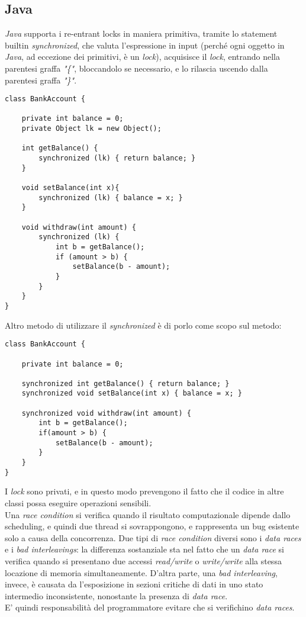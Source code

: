 \subsection{Java}
\textit{Java} supporta i re-entrant locks in maniera primitiva, tramite lo statement builtin \textit{synchronized}, che valuta l'espressione in input (perché ogni oggetto in \textit{Java}, ad eccezione dei primitivi, è un \textit{lock}), acquisisce il \textit{lock}, entrando nella parentesi graffa \textit{"\{"}, bloccandolo se necessario, e lo rilascia uscendo dalla parentesi graffa \textit{"\}"}.
\begin{lstlisting}
class BankAccount {

	private int balance = 0;
	private Object lk = new Object();

	int getBalance() {
		synchronized (lk) { return balance; }
	}

	void setBalance(int x){
		synchronized (lk) { balance = x; }
	}

	void withdraw(int amount) {
		synchronized (lk) {
			int b = getBalance();
			if (amount > b) {
				setBalance(b - amount);
			}
		}
	}
}
\end{lstlisting}

\newpage
Altro metodo di utilizzare il \textit{synchronized} è di porlo come scopo sul metodo:
\begin{lstlisting}
class BankAccount {

	private int balance = 0;

	synchronized int getBalance() { return balance; }
	synchronized void setBalance(int x) { balance = x; }

	synchronized void withdraw(int amount) {
		int b = getBalance();
		if(amount > b) {
			setBalance(b - amount);
		}
	}
}
\end{lstlisting}
I \textit{lock} sono privati, e in questo modo prevengono il fatto che il codice in altre classi possa eseguire operazioni sensibili. \\

Una \textit{race condition} si verifica quando il risultato computazionale dipende dallo scheduling, e quindi due thread si sovrappongono, e rappresenta un bug esistente solo a causa della concorrenza.
Due tipi di \textit{race condition} diversi sono i \textit{data races} e i \textit{bad interleavings}: la differenza sostanziale sta nel fatto che un \textit{data race} si verifica quando si presentano due accessi \textit{read/write} o \textit{write/write} alla stessa locazione di memoria simultaneamente. D'altra parte, una \textit{bad interleaving}, invece, è causata da l'esposizione in sezioni critiche di dati in uno stato intermedio inconsistente, nonostante la presenza di \textit{data race}. \\
E' quindi responsabilità del programmatore evitare che si verifichino \textit{data races}. \\

